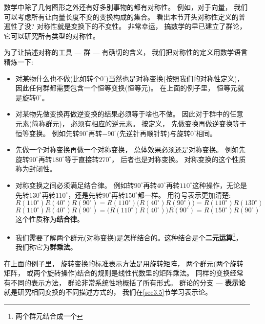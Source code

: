 数学中除了几何图形之外还有好多别事物的都有对称性。 例如，对于向量， 我们可以考虑所有让向量长度不变的变换构成的集合。 看出本节开头对称性定义的普遍性了没? 对称性就是变换下的不变性。 非常幸运， 搞数学的早已建立了群论， 它可以研究所有类型的对称性。

为了让描述对称的工具 --- 群 --- 有确切的含义， 我们把对称性的定义用数学语言精炼一下:
\begin{itemize}
	\item 对某物什么也不做(比如转个$0^\circ$)当然也是对称变换(按照我们的对称性定义)， 因此任何群都需要包含一个恒等变换(恒等元)。 在上面的例子里， 恒等元就是旋转$0^\circ$。

	\item 对某物先做变换再做逆变换的结果必须等于啥也不做。 因此对于群中的任意元素(简称群元)， 必须有相应的逆元素。 按定义， 先做变换再做逆变换等于恒等变换。 例如先转$90^\circ$再转$-90^\circ$(先逆针再顺针转)与旋转$0^\circ$相同。

	\item 先做一个对称变换再做一个对称变换， 总体效果必须还是对称变换。 例如先旋转$90^\circ$再转$180^\circ$等于直接转$270^\circ$， 后者也是对称变换。 对称变换的这个性质称为封闭性。

	\item 对称变换之间必须满足结合律。 例如转$90^\circ$再转$40^\circ$再转$110^\circ$这种操作，无论是先转$130^\circ$再转$110^\circ$，还是先转$90^\circ$再转$150^\circ$都一样。 用符号表示更加清楚:
	\begin{equation}\label{equ3.1}
	R(110^\circ) R(40^\circ) R(90^\circ) = R(110^\circ)\bigg( R(40^\circ)R(90^\circ) \bigg) = R(110^\circ) R(130^\circ)
	\end{equation}
	\begin{equation}\label{equ3.2}
	R(110^\circ) R(40^\circ) R(90^\circ) = \bigg( R(110^\circ) R(40^\circ) \bigg) R(90^\circ) = R(150^\circ) R(90^\circ)
	\end{equation}
	这个性质称为{\bf 结合律}。

	\item 我们需要了解两个群元(对称变换)是怎样结合的。这种结合是个{\bf 二元运算}\footnote{两个群元结合成一个}， 我们称它为{\bf 群乘法}。
\end{itemize}

	在上面的例子里， 旋转变换的标准表示方法是用旋转矩阵， 两个群元(两个旋转矩阵， 或两个旋转操作)结合的规则是线性代数里的矩阵乘法。 同样的变换经常有不同的表示方法， 群论非常系统性地概括了所有形式。 群论的分支 --- {\bf 表示论}就是研究相同变换的不同描述方式的， 我们在\ref{sec3.5}节学习表示论。

